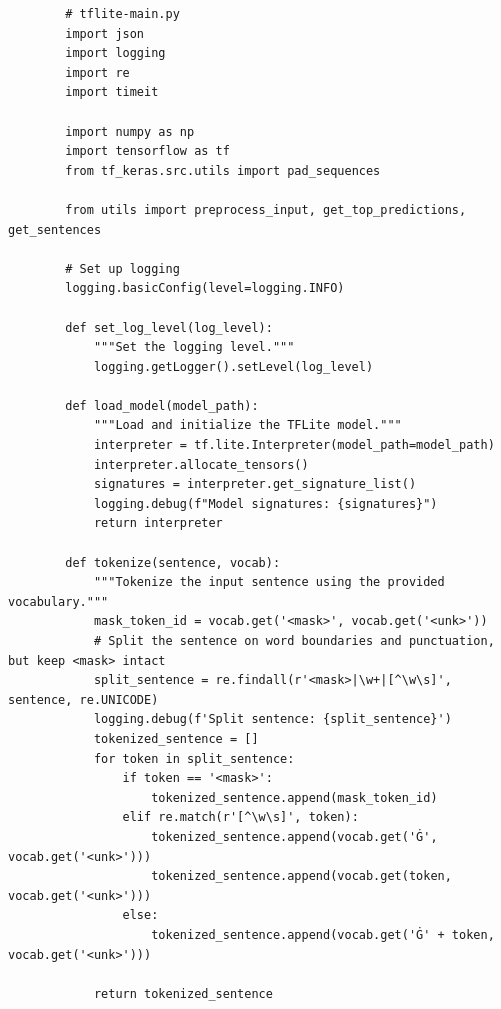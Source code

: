 \begin{listing}
    \begin{verbatim}
        # tflite-main.py
        import json
        import logging
        import re
        import timeit
        
        import numpy as np
        import tensorflow as tf
        from tf_keras.src.utils import pad_sequences
        
        from utils import preprocess_input, get_top_predictions, get_sentences
        
        # Set up logging
        logging.basicConfig(level=logging.INFO)
        
        def set_log_level(log_level):
            """Set the logging level."""
            logging.getLogger().setLevel(log_level)
        
        def load_model(model_path):
            """Load and initialize the TFLite model."""
            interpreter = tf.lite.Interpreter(model_path=model_path)
            interpreter.allocate_tensors()
            signatures = interpreter.get_signature_list()
            logging.debug(f"Model signatures: {signatures}")
            return interpreter
        
        def tokenize(sentence, vocab):
            """Tokenize the input sentence using the provided vocabulary."""
            mask_token_id = vocab.get('<mask>', vocab.get('<unk>'))
            # Split the sentence on word boundaries and punctuation, but keep <mask> intact
            split_sentence = re.findall(r'<mask>|\w+|[^\w\s]', sentence, re.UNICODE)
            logging.debug(f'Split sentence: {split_sentence}')
            tokenized_sentence = []
            for token in split_sentence:
                if token == '<mask>':
                    tokenized_sentence.append(mask_token_id)
                elif re.match(r'[^\w\s]', token):
                    tokenized_sentence.append(vocab.get('Ġ', vocab.get('<unk>')))
                    tokenized_sentence.append(vocab.get(token, vocab.get('<unk>')))
                else:
                    tokenized_sentence.append(vocab.get('Ġ' + token, vocab.get('<unk>')))
            
            return tokenized_sentence
    \end{verbatim}
    \caption[\texttt{tflite-main.py} (deel 1)]{Het eerste deel van \texttt{tflite-main.py} laadt en initialiseert de -modellen en implementeert een aangepaste tokenization methode. Deze methode maakt gebruik van een woordenschatbestand om invoerzinnen te tokeniseren, wat cruciaal is voor de compatibiliteit met de modellen.}
    \label{lst:tflite-main-part1}
\end{listing}

